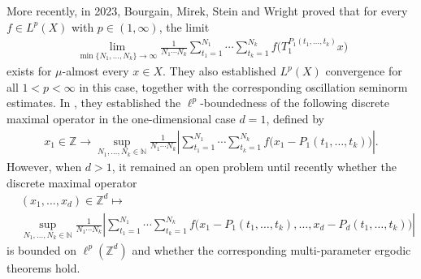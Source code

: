 \documentclass[10pt,a4paper]{amsart}
\numberwithin{equation}{section}
\begin{document}
More recently, in 2023, Bourgain, Mirek, Stein and Wright \cite{B4}  proved that for every
$f\in L^p(X)$ with $p\in(1,\infty)$, the limit
\begin{align*}
\lim_{\min\{N_1,\dots,N_k\}\to\infty}	\frac{1}{N_1\cdots N_k}
\sum_{t_1=1}^{N_1}\cdots\sum_{t_k=1}^{N_k}
	f\bigl(T_1^{P_1(t_1,\dots,t_k)}x\bigr)
\end{align*}
exists for $\mu$-almost every $x\in X$.
They also established $L^p(X)$ convergence for all $1<p<\infty$ in this case, together with
the corresponding oscillation seminorm estimates. In \cite{B4}, they established the $\ell^p$-boundedness of the following discrete maximal operator in the one-dimensional case $d=1$, defined by
\begin{align*}
	x_1\in\mathbb{Z}\rightarrow \sup_{N_1,\dots,N_k\in\mathbb{N}}
	\frac{1}{N_1\cdots N_k}\left|
\sum_{t_1=1}^{N_1}\cdots\sum_{t_k=1}^{N_k}
	f\bigl(x_1 - P_1(t_1,\dots,t_k)\bigr)\right|.
\end{align*}
However, when $d>1$, it remained an open problem until recently whether the discrete maximal operator
\begin{align*}
	&(x_1,\dots,x_d)\in\mathbb{Z}^{d}\longmapsto\\
	&\sup_{N_1,\dots,N_k\in\mathbb{N}}
	\frac{1}{N_1\cdots N_k}
	\left|\sum_{t_1=1}^{N_1}\cdots\sum_{t_k=1}^{N_k}
	f\bigl(x_1-P_1(t_1,\dots,t_k),\dots,
	x_d-P_d(t_1,\dots,t_k)\bigr)\right|
\end{align*}
is bounded on $\ell^p(\mathbb{Z}^d)$ and whether the corresponding multi-parameter ergodic theorems hold.
\end{document}
